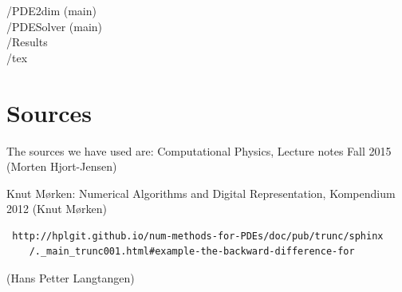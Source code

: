 \documentclass[a4paper,10pt]{article}
\begin{document}
/PDE2dim (main) \\
/PDESolver (main) \\
/Results \\
/tex \\

\section{Sources}
The sources we have used are:
Computational Physics, Lecture notes Fall 2015 (Morten Hjort-Jensen)

Knut Mørken: Numerical Algorithms and Digital Representation, Kompendium 2012 (Knut Mørken)

\begin{verbatim}
 http://hplgit.github.io/num-methods-for-PDEs/doc/pub/trunc/sphinx
	/._main_trunc001.html#example-the-backward-difference-for  
\end{verbatim}
    (Hans Petter Langtangen)
\end{document}
